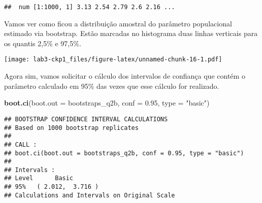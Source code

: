 \documentclass[]{article}
\newenvironment{Shaded}{\begin{snugshade}}{\end{snugshade}}
\newcommand{\KeywordTok}[1]{\textcolor[rgb]{0.13,0.29,0.53}{\textbf{#1}}}
\newcommand{\DataTypeTok}[1]{\textcolor[rgb]{0.13,0.29,0.53}{#1}}
\newcommand{\DecValTok}[1]{\textcolor[rgb]{0.00,0.00,0.81}{#1}}
\newcommand{\FloatTok}[1]{\textcolor[rgb]{0.00,0.00,0.81}{#1}}
\newcommand{\StringTok}[1]{\textcolor[rgb]{0.31,0.60,0.02}{#1}}
\newcommand{\OperatorTok}[1]{\textcolor[rgb]{0.81,0.36,0.00}{\textbf{#1}}}
\newcommand{\NormalTok}[1]{#1}
\begin{document}
\begin{verbatim}
##  num [1:1000, 1] 3.13 2.54 2.79 2.6 2.16 ...
\end{verbatim}

Vamos ver como ficou a distribuição amostral do parâmetro populacional
estimado via bootstrap. Estão marcadas no histograma duas linhas
verticais para os quantis 2,5\% e 97,5\%.

\begin{Shaded}
\end{Shaded}

\texttt{[image: lab3-ckp1\_files/figure-latex/unnamed-chunk-16-1.pdf]}

Agora sim, vamos solicitar o cálculo dos intervalos de confiança que
contém o parâmetro calculado em 95\% das vezes que esse cálculo for
realizado.

\begin{Shaded}
\begin{Highlighting}[]
\KeywordTok{boot.ci}\NormalTok{(}\DataTypeTok{boot.out =}\NormalTok{ bootstraps_q2b, }\DataTypeTok{conf =} \FloatTok{0.95}\NormalTok{, }\DataTypeTok{type =} \StringTok{"basic"}\NormalTok{)}
\end{Highlighting}
\end{Shaded}

\begin{verbatim}
## BOOTSTRAP CONFIDENCE INTERVAL CALCULATIONS
## Based on 1000 bootstrap replicates
## 
## CALL : 
## boot.ci(boot.out = bootstraps_q2b, conf = 0.95, type = "basic")
## 
## Intervals : 
## Level      Basic         
## 95%   ( 2.012,  3.716 )  
## Calculations and Intervals on Original Scale
\end{verbatim}
\end{document}
